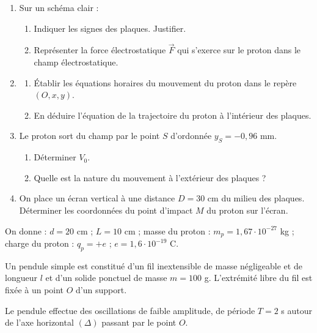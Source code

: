 \documentclass[11pt]{article}
\begin{document}
\begin{enumerate}
  \item Sur un schéma clair :
  \begin{enumerate}[label=\alph*.]
    \item Indiquer les signes des plaques. Justifier.
    \item Représenter la force électrostatique $\vec{F}$ qui s'exerce sur le proton dans le champ électrostatique.
  \end{enumerate}
  \item \begin{enumerate}[label=\alph*.]
    \item Établir les équations horaires du mouvement du proton dans le repère $(O, x, y)$.
    \item En déduire l'équation de la trajectoire du proton à l'intérieur des plaques.
  \end{enumerate}
  \item Le proton sort du champ par le point $S$ d'ordonnée $y_S = -0{,}96$ mm.
  \begin{enumerate}[label=\alph*.]
    \item Déterminer $V_0$.
    \item Quelle est la nature du mouvement à l'extérieur des plaques ?
  \end{enumerate}
  \item On place un écran vertical à une distance $D = 30$ cm du milieu des plaques. Déterminer les coordonnées du point d'impact $M$ du proton sur l'écran.
\end{enumerate}
\noindent On donne : $d = 20$ cm ; $L = 10$ cm ; masse du proton : $m_p = 1{,}67\cdot10^{-27}$ kg ; charge du proton : $q_p = +e$ ; $e = 1{,}6\cdot10^{-19}$ C.

\begin{minipage}{0.66\linewidth}
Un pendule simple est constitué d'un fil inextensible de masse négligeable et de longueur $l$ et d'un solide ponctuel de masse $m = 100$ g. L'extrémité libre du fil est fixée à un point $O$ d'un support.

Le pendule effectue des oscillations de faible amplitude, de période $T = 2$ s autour de l'axe horizontal $(\Delta)$ passant par le point $O$.
\end{minipage}\hfill
\begin{minipage}{0.3\linewidth}
\centering
{}
\end{minipage}
\end{document}
